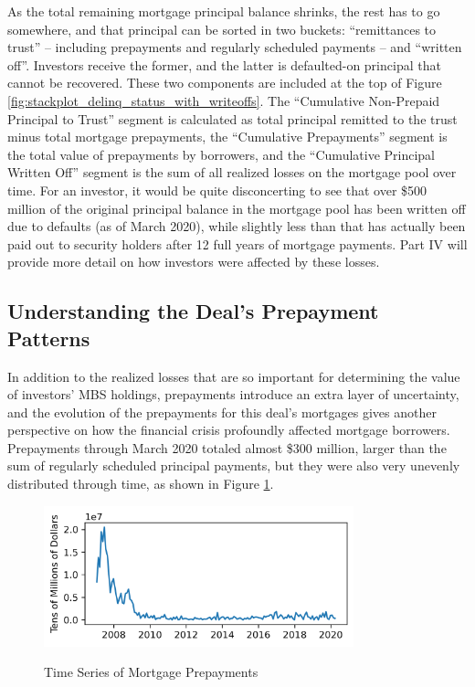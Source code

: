 \documentclass[12pt]{article}
\begin{document}
	As the total remaining mortgage principal balance shrinks, the rest has to go somewhere, and that principal can be sorted in two buckets: “remittances to trust” – including prepayments and regularly scheduled payments – and “written off”. Investors receive the former, and the latter is defaulted-on principal that cannot be recovered. These two components are included at the top of Figure \ref{fig:stackplot_delinq_status_with_writeoffs}. The “Cumulative Non-Prepaid Principal to Trust” segment is calculated as total principal remitted to the trust minus total mortgage prepayments, the “Cumulative Prepayments” segment is the total value of prepayments by borrowers, and the “Cumulative Principal Written Off” segment is the sum of all realized losses on the mortgage pool over time. For an investor, it would be quite disconcerting to see that over \$500 million of the original principal balance in the mortgage pool has been written off due to defaults (as of March 2020), while slightly less than that has actually been paid out to security holders after 12 full years of mortgage payments. Part IV will provide more detail on how investors were affected by these losses.

\subsection*{Understanding the Deal's Prepayment Patterns}

In addition to the realized losses that are so important for determining the value of investors’ MBS holdings, prepayments introduce an extra layer of uncertainty, and the evolution of the prepayments for this deal’s mortgages gives another perspective on how the financial crisis profoundly affected mortgage borrowers. Prepayments through March 2020 totaled almost \$300 million, larger than the sum of regularly scheduled principal payments, but they were also very unevenly distributed through time, as shown in Figure \ref{fig:timeseries_prepayments}.

\begin{figure}[h]
	\centering
	\caption{Time Series of Mortgage Prepayments}
	\includegraphics[width=0.8\textwidth]{../figures/timeseries_prepayments}
	\label{fig:timeseries_prepayments}
\end{figure}
\end{document}
